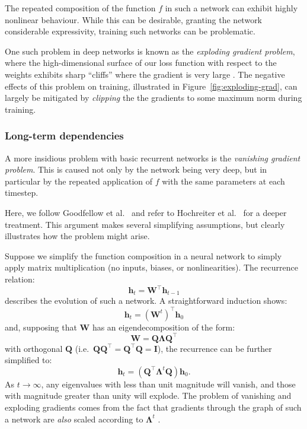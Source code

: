 \documentclass[12pt,a4paper,twoside,openright]{report}
\newcommand{\vect}[1]{\boldsymbol{\mathbf{#1}}}
\begin{document}
The repeated composition of the function $f$ in such a network can exhibit
highly nonlinear behaviour. While this can be desirable, granting the network
considerable expressivity, training such networks can be problematic. 

One such problem in deep networks is known as the \emph{exploding gradient
problem}, where the high-dimensional surface of our loss function with respect
to the weights exhibits sharp ``cliffs'' where the gradient is very large
\cite{Goodfellow-et-al-2016}. The negative effects of this problem on training,
illustrated in Figure~\ref{fig:exploding-grad}, can largely be mitigated by
\emph{clipping} the the gradients to some maximum norm during training.

\subsubsection{Long-term dependencies}

A more insidious problem with basic recurrent networks is the \emph{vanishing
gradient problem}. This is caused not only by the network being very deep, but
in particular by the repeated application of $f$ with the same parameters at
each timestep.

Here, we follow Goodfellow et al.\ \cite{Goodfellow-et-al-2016} and refer to
Hochreiter et al.\ \cite{hochreiter1997long} for a deeper treatment.
This argument makes several simplifying assumptions, but clearly illustrates how
the problem might arise.

Suppose we simplify the function composition in a neural network to simply apply
matrix multiplication (no inputs, biases, or nonlinearities). The
recurrence relation: 
$$ \vect{h}_t = \vect{W}^\top \vect{h}_{t-1} $$ 
describes the evolution of such a network. A straightforward induction shows:
$$ \vect{h}_t = (\vect{W}^t)^\top\vect{h}_0 $$
and, supposing that $\vect{W}$ has an eigendecomposition of the form:
$$ \vect{W} = \vect{Q}\vect{\Lambda}\vect{Q}^\top $$
with orthogonal $\vect{Q}$ (i.e.\ $\vect{Q}\vect{Q}^\top = \vect{Q}^\top\vect{Q}
= \vect{I}$), the recurrence can be further simplified to:
$$ \vect{h}_t = (\vect{Q}^\top \vect{\Lambda}^t \vect{Q}) \vect{h}_0. $$
As $t \rightarrow \infty$, any eigenvalues with less than unit magnitude will
vanish, and those with magnitude greater than unity will explode. The problem of
vanishing and exploding gradients comes from the fact that gradients through the
graph of such a network are \emph{also} scaled according to $\vect{\Lambda}^t$
\cite{Goodfellow-et-al-2016}.
\end{document}
